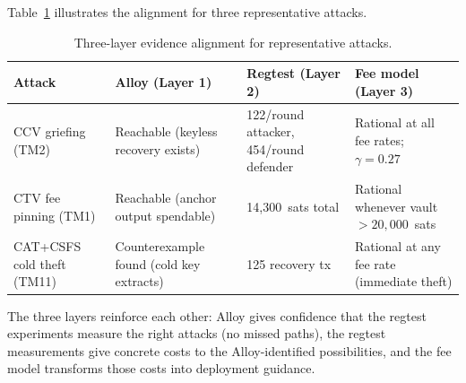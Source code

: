 Table~\ref{tab:three_layer} illustrates the alignment for three representative attacks.

\begin{table}[t]
\centering
\caption{Three-layer evidence alignment for representative attacks.}
\label{tab:three_layer}
\small
\begin{tabular}{@{}lp{2.5cm}p{3cm}p{3.5cm}@{}}
\toprule
Attack & Alloy (Layer 1) & Regtest (Layer 2) & Fee model (Layer 3) \\
\midrule
CCV griefing (TM2)
  & Reachable (keyless recovery exists)
  & 122\vB{}/round attacker, 454\vB{}/round defender
  & Rational at all fee rates; $\gamma = 0.27$ \\[6pt]

CTV fee pinning (TM1)
  & Reachable (anchor output spendable)
  & 14{,}300~sats total
  & Rational whenever vault $> 20{,}000$~sats \\[6pt]

CAT+CSFS cold theft (TM11)
  & Counterexample found (cold key extracts)
  & 125\vB{} recovery tx
  & Rational at any fee rate (immediate theft) \\
\bottomrule
\end{tabular}
\end{table}

The three layers reinforce each other: Alloy gives confidence that the regtest
experiments measure the right attacks (no missed paths), the regtest measurements
give concrete costs to the Alloy-identified possibilities, and the fee model
transforms those costs into deployment guidance.

